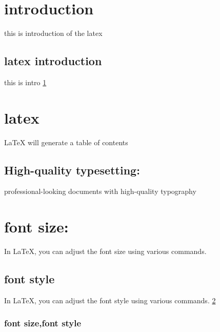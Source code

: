\documentclass{article}
\begin{document}
\tableofcontents
\newpage
\section{introduction}\label{sec:1}
 this is introduction of the latex
\subsection{latex introduction} this is intro \ref{sec:1}

\section{latex } \label{sec:latex} LaTeX will generate a table of
contents

\subsection{High-quality typesetting: }
professional-looking documents with high-quality typography

\section{font size:} \label{sec:fontsize}
\Huge{In LaTeX, you can adjust the font size using various commands.}

\subsection{font style}
In LaTeX, you can adjust the font style using various commands.
\ref{sec:latex}
\subsubsection{font size,font style}
\end{document}
